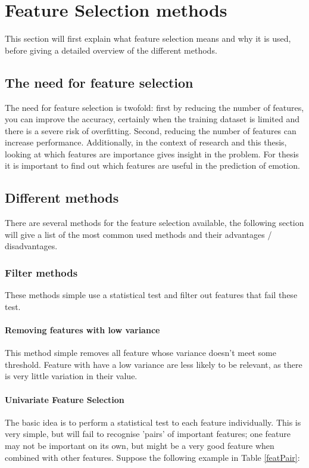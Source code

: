 \chapter{Feature Selection methods}
{\samenvatting This section will first explain what feature selection means and why it is used, before giving a detailed overview of the different methods.}


\section{The need for feature selection}
The need for feature selection is twofold: first by reducing the number of features, you can improve the accuracy, certainly when the training dataset is limited and there is a severe risk of overfitting. Second, reducing the number of features can increase performance. Additionally, in the context of research and this thesis, looking at which features are importance gives insight in the problem. For thesis it is important to find out which features are useful in the prediction of emotion.

\section{Different methods}
There are several methods for the feature selection available, the following section will give a list of the most common used methods and their advantages / disadvantages.

\subsection{Filter methods}
These methods simple use a statistical test and filter out features that fail these test. 

\subsubsection{Removing features with low variance}
This method simple removes all feature whose variance doesn't meet some threshold. Feature with have a low variance are less likely to be relevant, as there is very little variation in their value.

\subsubsection{Univariate Feature Selection}
The basic idea is to perform a statistical test to each feature individually. This is very simple, but will fail to recognise 'pairs' of important features; one feature may not be important on its own, but might be a very good feature when combined with other features. Suppose the following example in Table \ref{featPair}:

